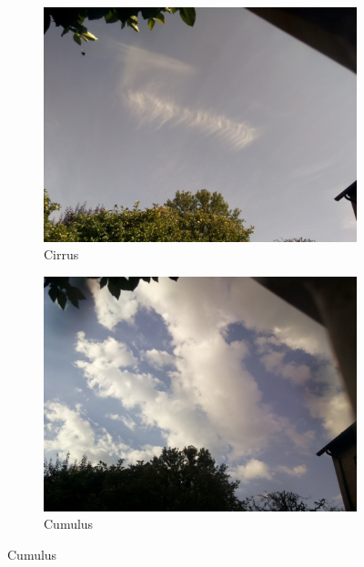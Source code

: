 \begin{figure}[h]
\begin{subfigure}[b]{0.31\textwidth}
		\label{fig:cirrostratus}
		\end{subfigure}
		\begin{subfigure}[b]{0.31\textwidth}
		\begin{center}
				\includegraphics[width=\textwidth]{./pictures/cloudtypes/cirrus.pdf}
		\end{center}
		\caption{Cirrus}
		\label{fig:cirrus}
		\end{subfigure}
		\begin{subfigure}[b]{0.31\textwidth}
		\begin{center}
				\includegraphics[width=\textwidth]{./pictures/cloudtypes/cumulus.pdf}
		\end{center}
		\caption{Cumulus}
		\label{fig:Cumulus}

\end{subfigure}
\end{figure}
